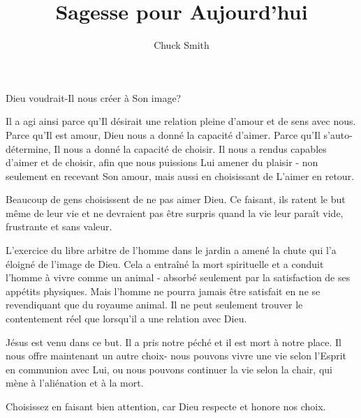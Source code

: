 \documentclass[paper=6.13in:9.21in,pagesize=pdftex,10pt,DIV=calc]{scrbook}
\title{Sagesse pour Aujourd'hui}
\author{Chuck Smith}
\begin{document}
\maketitle




 Dieu voudrait-Il nous créer à Son image? 

Il a agi ainsi parce qu'Il désirait une relation pleine d'amour et de sens avec nous. Parce qu'Il est amour, Dieu nous a donné la capacité d'aimer. Parce qu'Il s'auto-détermine, Il nous a donné la capacité de choisir. Il nous a rendus capables d'aimer et de choisir, afin que nous puissions Lui amener du plaisir - non seulement en recevant Son amour, mais aussi en choisissant de L'aimer en retour. 

Beaucoup de gens choisissent de ne pas aimer Dieu. Ce faisant, ils ratent le but même de leur vie et ne devraient pas être surpris quand la vie leur paraît vide, frustrante et sans valeur.


L'exercice du libre arbitre de l'homme dans le jardin a amené la chute qui l'a éloigné de l'image de Dieu. Cela a entraîné la mort spirituelle et a conduit l'homme à vivre comme un animal - absorbé seulement par la satisfaction de ses appétits physiques. Mais l'homme ne pourra jamais être satisfait en ne se revendiquant que du royaume animal. Il ne peut seulement trouver le contentement réel que lorsqu'il a une relation avec Dieu. 

Jésus est venu dans ce but. Il a pris notre péché et il est mort à notre place. Il nous offre maintenant un autre choix- nous pouvons vivre une vie selon l'Esprit en communion avec Lui, ou nous pouvons continuer la vie selon la chair, qui mène à l'aliénation et à la mort. 

Choisissez en faisant bien attention, car Dieu respecte et honore nos choix. 

\dvrule

\end{document}

